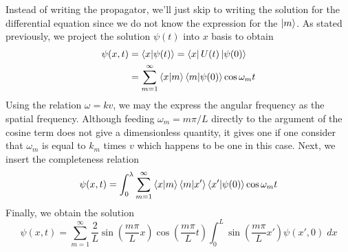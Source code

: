 \documentclass[../../../main.tex]{subfiles}
\begin{document}
Instead of writing the propagator, we'll just skip to writing the solution for the differential equation since we do not know the expression for the $\ket{m}$.
As stated previously, we project the solution $\psi(t)$ into $x$ basis to obtain 
\begin{align*}
	\psi(x,t)&=\braket{x|\psi(t)}=\bra{x}U(t)\ket{\psi(0)}\\
	&=\sum_{m=1 }^{\infty }\braket{x|m}\braket{m|\psi(0)}\cos \omega_m t
\end{align*}
Using the relation $\omega=kv$, we may the express the angular frequency as the spatial frequency.
Although feeding $\omega_m=m\pi/L$ directly to the argument of the cosine term does not give a dimensionless quantity, it gives one if one consider that $\omega_m$ is equal to $k_m$ times $v$ which happens to be one in this case.
Next, we insert the completeness relation
\begin{equation*}
	\psi(x,t)=\int_{0 }^{\lambda }\sum_{m=1 }^{\infty }\braket{x|m}\braket{m|x'}\braket{x'|\psi(0)}\cos \omega_m t
\end{equation*}
Finally, we obtain the solution 
\begin{equation*}
	\psi(x,t)=\sum_{m=1}^{\infty}\frac{2 }{L }\sin \left( \frac{m\pi }{L }x  \right) \cos \left( \frac{m\pi }{L }t \right) \int_{0 }^{L }\sin \left( \frac{m\pi }{L }x'  \right) \psi(x',0)\;dx
\end{equation*}
\end{document}
